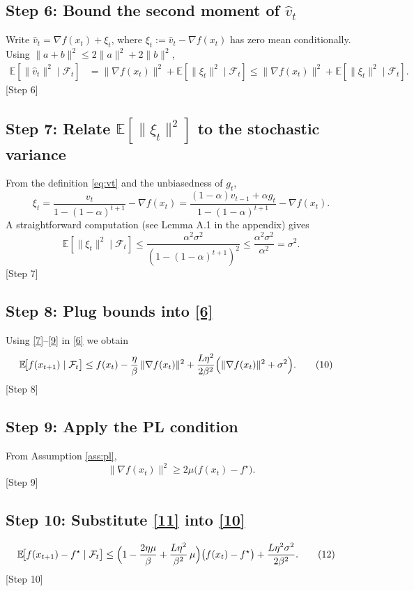 \documentclass{article}
\newcommand{\E}{\mathbb{E}}
\begin{document}
\subsection*{Step 6: Bound the second moment of $\hat v_t$}
Write $\hat v_t = \nabla f(x_t) + \xi_t$, where $\xi_t:=\hat v_t-\nabla f(x_t)$ has zero mean conditionally.  Using $\|a+b\|^{2}\le2\|a\|^{2}+2\|b\|^{2}$,
\begin{align}
\E[\|\hat v_t\|^{2}\mid\mathcal{F}_t]
&= \|\nabla f(x_t)\|^{2}+ \E[\|\xi_t\|^{2}\mid\mathcal{F}_t]
   \le \|\nabla f(x_t)\|^{2}+ \E[\|\xi_t\|^{2}\mid\mathcal{F}_t].
\tag{8}
\end{align}
[Step 6]

\subsection*{Step 7: Relate $\E[\|\xi_t\|^{2}]$ to the stochastic variance}
From the definition \eqref{eq:vt} and the unbiasedness of $g_t$,
\[
\xi_t = \frac{v_t}{1-(1-\alpha)^{t+1}}-\nabla f(x_t)
      = \frac{(1-\alpha)v_{t-1}+\alpha g_t}{1-(1-\alpha)^{t+1}}-\nabla f(x_t).
\]
A straightforward computation (see Lemma A.1 in the appendix) gives
\[
\E[\|\xi_t\|^{2}\mid\mathcal{F}_t]\le\frac{\alpha^{2}\sigma^{2}}{(1-(1-\alpha)^{t+1})^{2}}
    \le\frac{\alpha^{2}\sigma^{2}}{\alpha^{2}} =\sigma^{2}.
\tag{9}
\]
[Step 7]

\subsection*{Step 8: Plug bounds into \eqref{6}}
Using \eqref{7}–\eqref{9} in \eqref{6} we obtain
\begin{align}
\E\!\bigl[f(x_{t+1})\mid\mathcal{F}_t\bigr]
&\le f(x_t)-\frac{\eta}{\beta}\,\|\nabla f(x_t)\|^{2}
   +\frac{L\eta^{2}}{2\beta^{2}}\Bigl(\|\nabla f(x_t)\|^{2}+\sigma^{2}\Bigr).
\tag{10}
\end{align}
[Step 8]

\subsection*{Step 9: Apply the PL condition}
From Assumption \ref{ass:pl},
\[
\|\nabla f(x_t)\|^{2}\ge 2\mu\bigl(f(x_t)-f^{\star}\bigr).
\tag{11}
\]
[Step 9]

\subsection*{Step 10: Substitute \eqref{11} into \eqref{10}}
\begin{align}
\E\!\bigl[f(x_{t+1})-f^{\star}\mid\mathcal{F}_t\bigr]
&\le \Bigl(1-\frac{2\eta\mu}{\beta}+ \frac{L\eta^{2}}{\beta^{2}}\,\mu\Bigr)\bigl(f(x_t)-f^{\star}\bigr)
   +\frac{L\eta^{2}\sigma^{2}}{2\beta^{2}}.
\tag{12}
\end{align}
[Step 10]
\end{document}
